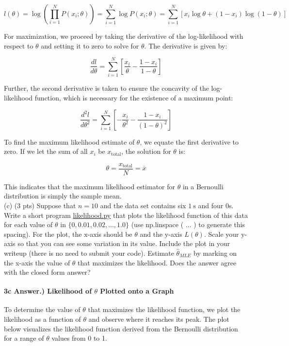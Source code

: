 \documentclass[10pt]{article}
\begin{document}
\[ l(\theta) = \log \left( \prod_{i=1}^{N} P(x_i; \theta) \right) = \sum_{i=1}^{N} \log P(x_i; \theta) = \sum_{i=1}^{N} \left[ x_i \log \theta + (1 - x_i) \log(1 - \theta) \right] \]

For maximization, we proceed by taking the derivative of the log-likelihood with respect to \( \theta \) and setting it to zero to solve for \( \theta \). The derivative is given by:

\[ \frac{dl}{d\theta} = \sum_{i=1}^{N} \left[ \frac{x_i}{\theta} - \frac{1 - x_i}{1 - \theta} \right] \]

Further, the second derivative is taken to ensure the concavity of the log-likelihood function, which is necessary for the existence of a maximum point:

\[ \frac{d^2l}{d\theta^2} = \sum_{i=1}^{N} \left[ -\frac{x_i}{\theta^2} - \frac{1 - x_i}{(1 - \theta)^2} \right] \]

To find the maximum likelihood estimate of \( \theta \), we equate the first derivative to zero. If we let the sum of all \( x_i \) be \( x_{\text{total}} \), the solution for \( \theta \) is:

\[ \theta = \frac{x_{\text{total}}}{N} = \bar{x} \]

This indicates that the maximum likelihood estimator for \( \theta \) in a Bernoulli distribution is simply the sample mean.\\


(c) (3 pts) Suppose that $n=10$ and the data set contains six $1 \mathrm{~s}$ and four 0s. Write a short program \href{http://likelihood.py}{likelihood.py} that plots the likelihood function of this data for each value of $\theta$ in $\{0,0.01,0.02, \ldots, 1.0\}$ (use np.linspace ( $\ldots$ ) to generate this spacing). For the plot, the $\mathrm{x}$-axis should be $\theta$ and the $\mathrm{y}$-axis $L(\theta)$. Scale your $\mathrm{y}$-axis so that you can see some variation in its value. Include the plot in your writeup (there is no need to submit your code). Estimate $\hat{\theta}_{M L E}$ by marking on the x-axis the value of $\theta$ that maximizes the likelihood. Does the answer agree with the closed form answer?

\paragraph{3c Answer.) Likelihood of $\theta$ Plotted onto a Graph}
\hspace{1cm}

To determine the value of \( \theta \) that maximizes the likelihood function, we plot the likelihood as a function of \( \theta \) and observe where it reaches its peak. The plot below visualizes the likelihood function derived from the Bernoulli distribution for a range of \( \theta \) values from 0 to 1.
\end{document}
